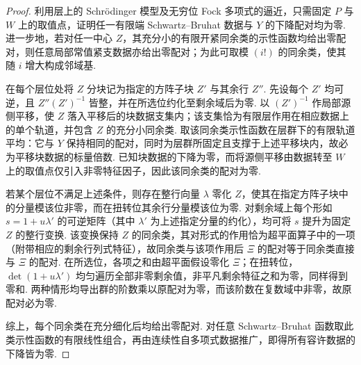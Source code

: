 \begin{proof}
利用层上的 Schrödinger 模型及无穷位 Fock 多项式的逼近，只需固定 $P$ 与 $W$ 上的取值点，证明任一有限端 Schwartz--Bruhat 数据与 $Y$ 的下降配对均为零. 进一步地，若对任一中心 $Z$，其充分小的有限开紧同余类的示性函数均给出零配对，则任意局部常值紧支数据亦给出零配对；为此可取模 $(i!)$ 的同余类，使其随 $i$ 增大构成邻域基.

在每个层位处将 $Z$ 分块记为指定的方阵子块 $Z'$ 与其余行 $Z''$. 先设每个 $Z'$ 均可逆，且 $Z''(Z')^{-1}$ 皆整，并在所选位约化至剩余域后为零. 以 $(Z')^{-1}$ 作局部源侧平移，使 $Z$ 落入平移后的块数据支集内；该支集恰为有限层作用在相应数据上的单个轨道，并包含 $Z$ 的充分小同余类. 取该同余类示性函数在层群下的有限轨道平均：它与 $Y$ 保持相同的配对，同时为层群所固定且支撑于上述平移块内，故必为平移块数据的标量倍数. 已知块数据的下降为零，而将源侧平移由数据转至 $W$ 上的取值点仅引入非零特征因子，因此该同余类的配对为零.

若某个层位不满足上述条件，则存在整行向量 $\lambda$ 零化 $Z$，使其在指定方阵子块中的分量模该位非零，而在扭转位其余行分量模该位为零. 对剩余域上每个形如 $s=1+u\lambda'$ 的可逆矩阵（其中 $\lambda'$ 为上述指定分量的约化），均可将 $s$ 提升为固定 $Z$ 的整行变换. 该变换保持 $Z$ 的同余类，其对形式的作用恰为超平面算子中的一项（附带相应的剩余行列式特征），故同余类与该项作用后 $\Xi$ 的配对等于同余类直接与 $\Xi$ 的配对. 在所选位，各项之和由超平面假设零化 $\Xi$；在扭转位，$\det(1+u\lambda')$ 均匀遍历全部非零剩余值，非平凡剩余特征之和为零，同样得到零和. 两种情形均导出群的阶数乘以原配对为零，而该阶数在复数域中非零，故原配对必为零.

综上，每个同余类在充分细化后均给出零配对. 对任意 Schwartz--Bruhat 函数取此类示性函数的有限线性组合，再由连续性自多项式数据推广，即得所有容许数据的下降皆为零.
\end{proof}

